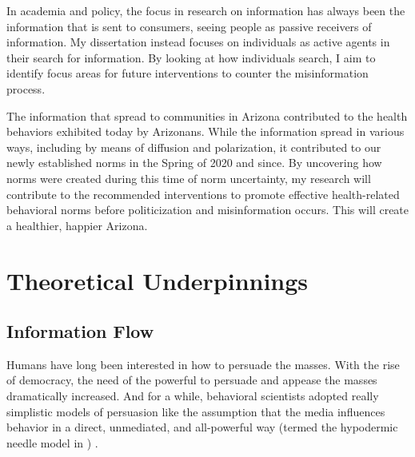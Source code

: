 In academia and policy, the focus in research on information has always
been the information that is sent to consumers, seeing people as passive
receivers of information. My dissertation instead focuses on individuals as
active agents in their search for information. By looking at how individuals 
search, I aim to identify focus areas for future interventions
to counter the misinformation process.

The information that spread to communities in Arizona contributed to the health
behaviors exhibited today by Arizonans. While the information spread in various
ways, including by means of diffusion and polarization, it contributed to our newly
established norms in the Spring of 2020 and since. By uncovering how norms were
created during this time of norm uncertainty, my research will contribute to the
recommended interventions to promote effective health-related behavioral norms
before politicization and misinformation occurs. This will create a healthier,
happier Arizona.

\section{Theoretical Underpinnings}

\subsection{Information Flow}
Humans have long been interested in how to persuade the masses. With the 
rise of democracy, the need of the powerful to persuade and appease the
masses dramatically increased. And for a while, behavioral scientists 
adopted really simplistic models of persuasion like the assumption
that the media influences behavior in a direct, unmediated, and 
all-powerful way (termed the hypodermic needle model in
\citet{bineham1988historical}) \citep{lasswellpropaganda}. 


